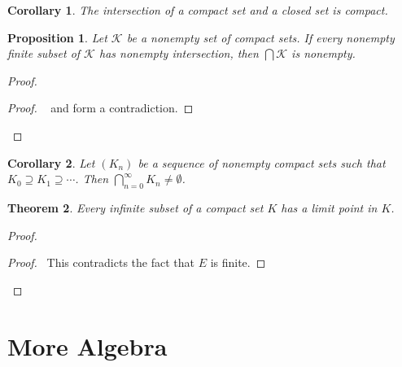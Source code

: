 \documentclass{book}
\let\qed\relax
\newtheorem{prop}{Proposition}[chapter]
\newtheorem{cor}{Corollary}[prop]
\newtheorem{thm}[prop]{Theorem}
\theoremstyle{definition}
\begin{document}
\begin{cor}
The intersection of a compact set and a closed set is compact.
\end{cor}

\begin{prop}
Let $\mathcal{K}$ be a nonempty set of compact sets. If every nonempty finite subset of $\mathcal{K}$ has nonempty intersection, then $\bigcap \mathcal{K}$ is nonempty.
\end{prop}

\begin{proof}
\pf
{}
\qedstep
\begin{proof}
	\pf\  and  form a contradiction.
\end{proof}
\qed
\end{proof}

\begin{cor}
Let $(K_n)$ be a sequence of nonempty compact sets such that $K_0 \supseteq K_1 \supseteq \cdots$. Then $\bigcap_{n=0}^\infty K_n \neq \emptyset$.
\end{cor}

\begin{thm}
Every infinite subset of a compact set $K$ has a limit point in $K$.
\end{thm}

\begin{proof}
\pf
{}
\qedstep
\begin{proof}
	\pf\ This contradicts the fact that $E$ is finite.
\end{proof}
\qed
\end{proof}

\part{More Algebra}
\end{document}
